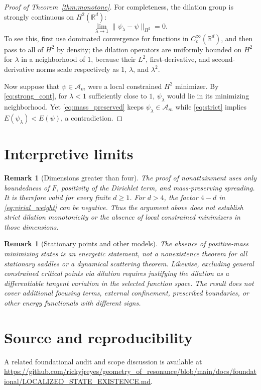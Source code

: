 \documentclass[11pt]{article}
\newtheorem{remark}[theorem]{Remark}
\newcommand{\R}{\mathbb{R}}
\newcommand{\A}{\mathcal{A}}
\begin{document}
\begin{proof}[Proof of Theorem~\ref{thm:monotone}]
For completeness, the dilation group is strongly continuous on
$H^2(\R^d)$:
\begin{equation}\label{eq:strong_cont}
 \lim_{\lambda\to1}\|\psi_\lambda-\psi\|_{H^2}=0.
\end{equation}
To see this, first use dominated convergence for functions in
$C_c^\infty(\R^d)$, and then pass to all of $H^2$ by density;
the dilation operators are uniformly bounded on $H^2$ for
$\lambda$ in a neighborhood of $1$, because their
$L^2$, first-derivative, and second-derivative norms scale
respectively as $1$, $\lambda$, and $\lambda^2$.

Now suppose that $\psi\in\A_m$ were a local constrained
$H^2$ minimizer. By \eqref{eq:strong_cont}, for $\lambda<1$
sufficiently close to $1$, $\psi_\lambda$ would lie in its
minimizing neighborhood. Yet \eqref{eq:mass_preserved} keeps
$\psi_\lambda\in\A_m$ while \eqref{eq:strict} implies
$E(\psi_\lambda)<E(\psi)$, a contradiction.
\end{proof}

\section{Interpretive limits}
\begin{remark}[Dimensions greater than four]
The proof of nonattainment uses only boundedness of $F$,
positivity of the Dirichlet term, and mass-preserving
spreading. It is therefore valid for every finite $d\ge1$.
For $d>4$, the factor $4-d$ in \eqref{eq:virial_weight}
can be negative. Thus the argument above does not establish
strict dilation monotonicity or the absence of \emph{local}
constrained minimizers in those dimensions.
\end{remark}

\begin{remark}[Stationary points and other models]
The absence of positive-mass minimizing states is an energetic
statement, not a nonexistence theorem for all stationary
saddles or a dynamical scattering theorem. Likewise, excluding
general constrained critical points via dilation requires
justifying the dilation as a differentiable tangent variation
in the selected function space. The result does not cover
additional focusing terms, external confinement, prescribed
boundaries, or other energy functionals with different signs.
\end{remark}

\section*{Source and reproducibility}
A related foundational audit and scope discussion is available at
\url{https://github.com/rickyjreyes/geometry_of_resonance/blob/main/docs/foundational/LOCALIZED_STATE_EXISTENCE.md}.
\end{document}
